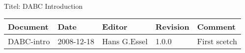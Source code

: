 \\Titel: DABC Introduction
\begin{table}[h]
\begin{tabular}{|p{2.8cm}|p{2.0cm}|p{3.0cm}|p{1.6cm}|p{5.0cm}|} \hline
Document   & Date        & Editor       & Revision & Comment \\
\hline DABC-intro & 2008-12-18 & Hans G.Essel & 1.0.0    & First
scetch \\ \hline
\end{tabular}
\end{table}
